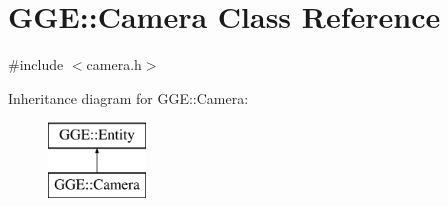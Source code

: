 \hypertarget{class_g_g_e_1_1_camera}{\section{G\+G\+E\+:\+:Camera Class Reference}
\label{class_g_g_e_1_1_camera}
}


{\ttfamily \#include $<$camera.\+h$>$}

Inheritance diagram for G\+G\+E\+:\+:Camera\+:\begin{figure}[H]
\begin{center}
\leavevmode
\includegraphics[height=2.000000cm]{class_g_g_e_1_1_camera}
\end{center}
\end{figure}
